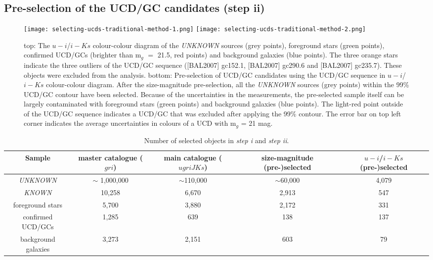 \documentclass[fleqn,usenatbib]{mnras}
\begin{document}
\subsection{Pre-selection of the UCD/GC candidates (step ii)}

\begin{figure}
\centering
\texttt{[image: selecting-ucds-traditional-method-1.png]}
\texttt{[image: selecting-ucds-traditional-method-2.png]}
\caption{top: The $u-i$/$i-Ks$ colour-colour diagram of the \textit{UNKNOWN} sources (grey points), foreground stars (green points), confirmed UCD/GCs (brighter than m$_g$ $=$ 21.5, red points) and background galaxies (blue points). The three orange stars indicate the three outliers of the UCD/GC sequence ([BAL2007] gc152.1, [BAL2007] gc290.6 and [BAL2007] gc235.7). These objects were excluded from the analysis. bottom: Pre-selection of UCD/GC candidates using the UCD/GC sequence in $u-i$/$i-Ks$ colour-colour diagram. After the size-magnitude pre-selection, all the \textit{UNKNOWN} sources (grey points) within the 99\% UCD/GC contour have been selected. Because of the uncertainties in the measurements, the pre-selected sample itself can be largely contaminated with foreground stars (green points) and background galaxies (blue points). The light-red point outside of the UCD/GC sequence indicates a UCD/GC that was excluded after applying the 99\% contour. The error bar on top left corner indicates the average uncertainties in colours of a UCD with m$_g$ = 21 mag.}
\label{preselection}
\end{figure}

\begin{table*}
\centering
\caption{Number of selected objects in \textit{step i} and \textit{step ii}. }
\begin{tabular}{ ccccc } \hline  
Sample & master catalogue ($gri$) & main catalogue ($ugriJKs$) & size-magnitude (pre-)selected & $u-i$/$i-Ks$ (pre-)selected \\
\hline
\textit{UNKNOWN} & $\sim$ 1,000,000 &  $\sim$110,000 & $\sim$60,000 & 4,079\\
\textit{KNOWN} &  10,258 & 6,670 & 2,913 & 547\\
foreground stars & 5,700 & 3,880 & 2,172 & 331\\
confirmed UCD/GCs & 1,285 & 639 & 138 & 137\\
background galaxies & 3,273 & 2,151 & 603 & 79\\ 
\hline 
\end{tabular}
\label{numbers}
\end{table*}
\end{document}
